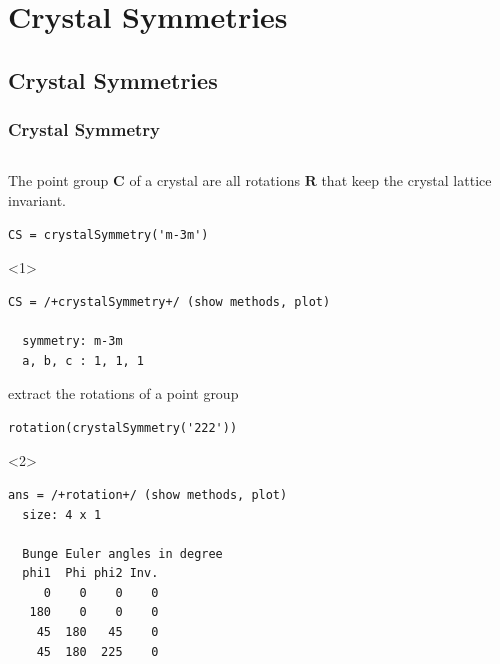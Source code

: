 \documentclass[compress]{beamer}
\begin{document}
\section{Crystal Symmetries}
\label{sec:symmetries}

\subsection*{Crystal Symmetries}
\label{sec:crystal-symmetries}

\begin{frame}
  \frametitle{Crystal Symmetry}

  \begin{columns}
  \begin{column}{8cm}

    \begin{overlayarea}{8cm}{8cm}
      The \alert{point group} $\mathbf C$ of a crystal are all rotations
      $\mathbf R$ that keep the crystal lattice invariant.

\begin{lstlisting}[style=input]
CS = crystalSymmetry('m-3m')
\end{lstlisting}
    \begin{onlyenv}<1>
\vspace{-.3cm}\begin{lstlisting}[style=output]
CS = /+crystalSymmetry+/ (show methods, plot)

  symmetry: m-3m
  a, b, c : 1, 1, 1
\end{lstlisting}
    \end{onlyenv}

    \pause \medskip

    extract the rotations of a point group
\begin{lstlisting}[style=input]
 rotation(crystalSymmetry('222'))
\end{lstlisting}
    \begin{onlyenv}<2>
\vspace{-.3cm}\begin{lstlisting}[style=output]
ans = /+rotation+/ (show methods, plot)
  size: 4 x 1

  Bunge Euler angles in degree
  phi1  Phi phi2 Inv.
     0    0    0    0
   180    0    0    0
    45  180   45    0
    45  180  225    0
\end{lstlisting}
    \end{onlyenv}

    \pause \medskip


\end{overlayarea}
\end{column}
\end{columns}
\end{frame}
\end{document}

